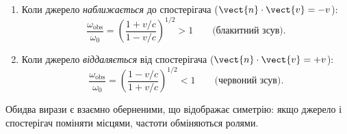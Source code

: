 \begin{enumerate}
\item Коли джерело \emph{наближається} до спостерігача
($\vect{n}\cdot\vect{v} = -v$):
\begin{equation*}
    \frac{\omega_{\text{obs}}}{\omega_0}
    = \left(\frac{1 + v/c}{1 - v/c}\right)^{\!1/2} > 1
    \qquad \text{(блакитний зсув)}.
\end{equation*}
\item Коли джерело \emph{віддаляється} від спостерігача
($\vect{n}\cdot\vect{v} = +v$):
\begin{equation*}
    \frac{\omega_{\text{obs}}}{\omega_0}
    = \left(\frac{1 - v/c}{1 + v/c}\right)^{\!1/2} < 1
    \qquad \text{(червоний зсув)}.
\end{equation*}
\end{enumerate}

Обидва вирази є взаємно оберненими, що відображає симетрію: якщо
джерело і спостерігач поміняти місцями, частоти обміняються ролями.

